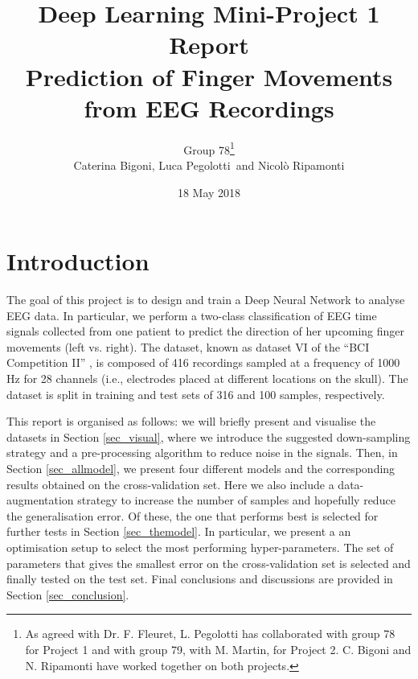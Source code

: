 \documentclass{article}
\begin{document}
\title{Deep Learning Mini-Project 1 Report \\ Prediction of Finger Movements from EEG Recordings}

\author{Group 78\footnote{As agreed with Dr. F. Fleuret, L. Pegolotti has collaborated with group 78 for Project 1 and with group 79, with M. Martin, for Project 2. C. Bigoni and N. Ripamonti have worked together on both projects.}\\ Caterina Bigoni, Luca Pegolotti \,and Nicol\`o Ripamonti}
\date{18 May 2018}
\maketitle




\section{Introduction}
 The goal of this project is to design and train a Deep Neural Network to analyse EEG data. 
 In particular, we perform a two-class classification of EEG time signals collected from one patient to predict the direction of her upcoming finger movements (left vs. right). 
 The  dataset,  known as dataset VI  of the ``BCI Competition II'' \cite{bci_ii}, is composed of 416 recordings  sampled at  a  frequency of 1000 Hz for 28 channels (i.e., electrodes placed at different locations on the skull).
The dataset is split in training and test sets of 316 and 100 samples, respectively. 

This report is organised as follows: we will briefly present and visualise the datasets in Section \ref{sec_visual}, where we introduce the suggested down-sampling strategy and a pre-processing algorithm to reduce  noise in the signals. 
Then, in Section \ref{sec_allmodel}, we  present four  different models and the corresponding results obtained on the cross-validation set.
Here we also include a data-augmentation strategy to increase the number of samples and hopefully reduce the generalisation error. 
Of these, the one that performs best is selected for further tests in Section \ref{sec_themodel}. 
In particular, we present a  an optimisation setup to select the most performing hyper-parameters.
The set of parameters that gives the smallest error on the cross-validation set is selected and finally tested on the test set.  
Final conclusions and discussions are provided in Section \ref{sec_conclusion}. 
\end{document}
